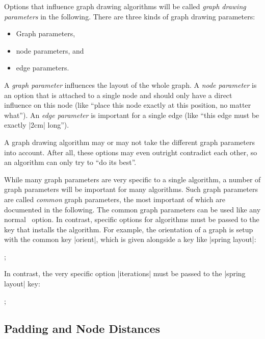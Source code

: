 Options that influence graph drawing algorithms will be called
\emph{graph drawing parameters} in the following. There are three kinds of
graph drawing parameters:
\begin{itemize}
\item Graph parameters,
\item node parameters, and
\item edge parameters.
\end{itemize}
A \emph{graph parameter} influences the layout of the whole
graph. A  \emph{node parameter} is an option that is attached to
a single node and should only have a direct influence on this node
(like ``place this node exactly at this position, no matter what''). An
\emph{edge parameter} is important for a single edge (like
``this edge must be exactly |2cm| long'').

A graph drawing algorithm may or may not take the different graph
parameters into account. After all, these options may even outright
contradict each other, so an algorithm can only try to ``do its
best''.

While many graph parameters are very specific to a single algorithm, a
number of graph parameters will be important for many algorithms. Such
graph parameters are called \emph{common} graph parameters, the most
important of which are documented in the following. The common graph
parameters can be used like any normal \tikzname\ option. In contrast,
specific options for algorithms must be passed to the key that
installs the algorithm. For example, the orientation of a graph
is setup with the common key |orient|, which is given alongside a key
like |spring layout|:

\begin{codeexample}[]
\tikz {};  
\end{codeexample}

In contrast, the very specific option |iterations| must be
passed to the |spring layout| key:

\begin{codeexample}[]
\tikz {};  
\end{codeexample}





\subsection{Padding and Node Distances}

